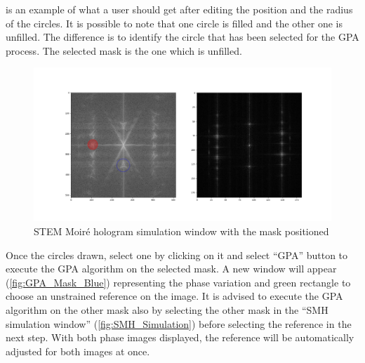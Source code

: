 \documentclass[12pt, titlepage]{article}
\begin{document}
 is an example of what a user should get after editing the position and the radius of the circles. It is possible to note that one circle is filled and the other one is unfilled. The difference is to identify the circle that has been selected for the GPA process. The selected mask is the one which is unfilled. 

\begin{figure}[H]
\centering
\includegraphics[scale=0.35]{Figures/SMH_Simulation-1.png}
\caption{STEM Moir{\'e} hologram simulation window with the mask positioned}
\label{fig:SMH_Simulation_1}
\end{figure}

Once the circles drawn, select one by clicking on it and select \enquote{GPA} button to execute the GPA algorithm on the selected mask. A new window will appear (\cref{fig:GPA_Mask_Blue}) representing the phase variation and green rectangle to choose an unstrained reference on the image. It is advised to execute the GPA algorithm on the other mask also by selecting the other mask in the \enquote{SMH simulation window} (\cref{fig:SMH_Simulation}) before selecting the reference in the next step. With both phase images displayed, the reference will be automatically adjusted for both images at once.
\end{document}
